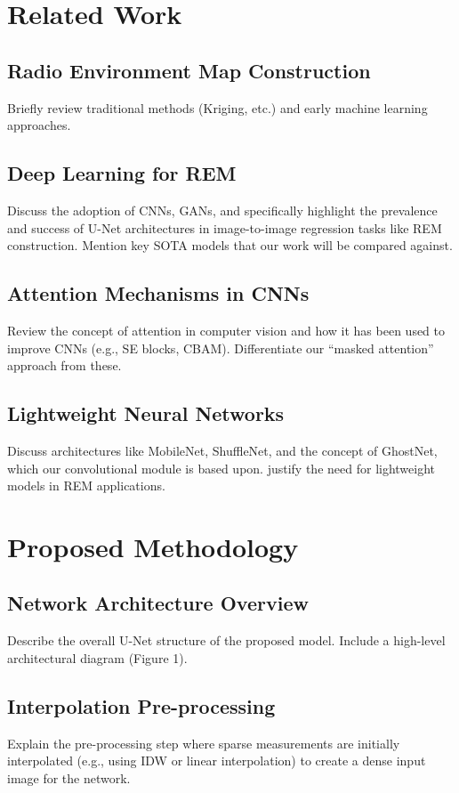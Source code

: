 \documentclass[conference]{IEEEtran}
\begin{document}
\section{Related Work}
\subsection{Radio Environment Map Construction}
Briefly review traditional methods (Kriging, etc.) and early machine learning approaches.
\subsection{Deep Learning for REM}
Discuss the adoption of CNNs, GANs, and specifically highlight the prevalence and success of U-Net 
architectures in image-to-image regression tasks like REM construction. Mention key SOTA models that 
our work will be compared against.
\subsection{Attention Mechanisms in CNNs}
Review the concept of attention in computer vision and how it has been used to improve CNNs (e.g., SE blocks, 
CBAM). Differentiate our ``masked attention'' approach from these.
\subsection{Lightweight Neural Networks}
Discuss architectures like MobileNet, ShuffleNet, and the concept of GhostNet, which our convolutional 
module is based upon. justify the need for lightweight models in REM applications.

\section{Proposed Methodology}
\subsection{Network Architecture Overview}
Describe the overall U-Net structure of the proposed model. Include a high-level architectural diagram 
(Figure 1).
\subsection{Interpolation Pre-processing}
Explain the pre-processing step where sparse measurements are initially interpolated (e.g., using 
IDW or linear interpolation) to create a dense input image for the network.
\end{document}
